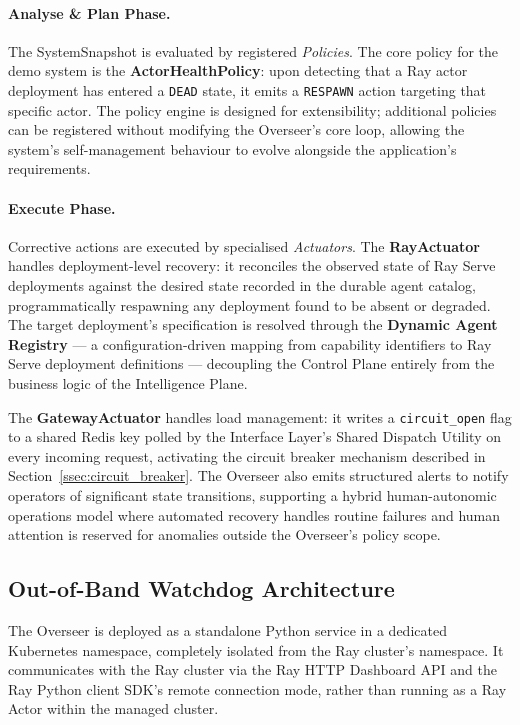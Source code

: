 \documentclass[12pt, a4paper]{report}
\begin{document}
\paragraph{Analyse \& Plan Phase.}
The SystemSnapshot is evaluated by registered \emph{Policies}.
The core policy for the demo system is the \textbf{ActorHealthPolicy}: upon detecting
that a Ray actor deployment has entered a \texttt{DEAD} state, it emits a
\texttt{RESPAWN} action targeting that specific actor.
The policy engine is designed for extensibility; additional policies can be registered
without modifying the Overseer's core loop, allowing the system's self-management
behaviour to evolve alongside the application's requirements.

\paragraph{Execute Phase.}
Corrective actions are executed by specialised \emph{Actuators}.
The \textbf{RayActuator} handles deployment-level recovery: it reconciles the observed
state of Ray Serve deployments against the desired state recorded in the durable agent
catalog, programmatically respawning any deployment found to be absent or degraded.
The target deployment's specification is resolved through the \textbf{Dynamic Agent
Registry} — a configuration-driven mapping from capability identifiers to Ray Serve
deployment definitions — decoupling the Control Plane entirely from the business logic
of the Intelligence Plane.

The \textbf{GatewayActuator} handles load management: it writes a
\texttt{circuit\_open} flag to a shared Redis key polled by the Interface Layer's
Shared Dispatch Utility on every incoming request, activating the circuit breaker
mechanism described in Section~\ref{ssec:circuit_breaker}.
The Overseer also emits structured alerts to notify operators of significant state
transitions, supporting a hybrid human-autonomic operations model where automated
recovery handles routine failures and human attention is reserved for anomalies outside
the Overseer's policy scope.

\subsection{Out-of-Band Watchdog Architecture}
\label{ssec:watchdog}

The Overseer is deployed as a standalone Python service in a dedicated Kubernetes
namespace, completely isolated from the Ray cluster's namespace.
It communicates with the Ray cluster via the Ray HTTP Dashboard API and the Ray
Python client SDK's remote connection mode, rather than running as a Ray Actor within
the managed cluster.
\end{document}
